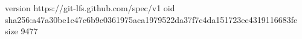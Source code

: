 version https://git-lfs.github.com/spec/v1
oid sha256:a47a30be1c47c6b9c0361975aca1979522da37f7c4da151723ee4319116683fe
size 9477
